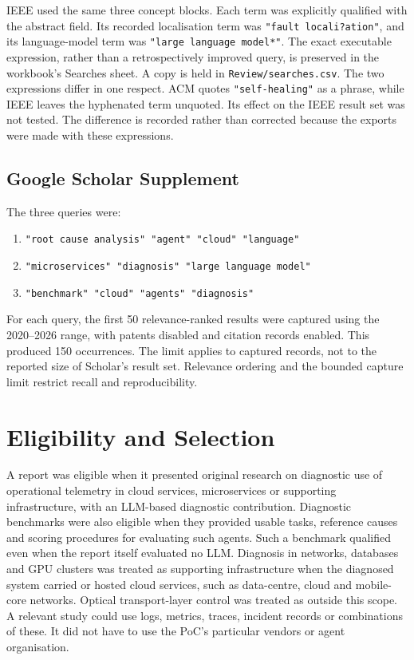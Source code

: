 IEEE used the same three concept blocks. Each term was explicitly
qualified with the abstract field. Its recorded localisation term was
\texttt{"fault locali?ation"}, and its language-model term was
\texttt{"large language model*"}. The exact executable expression, rather
than a retrospectively improved query, is preserved in the workbook's
Searches sheet. A copy is held in \texttt{Review/searches.csv}. The two
expressions differ in one respect. ACM quotes \texttt{"self-healing"} as a
phrase, while IEEE leaves the hyphenated term unquoted. Its effect on the
IEEE result set was not tested. The difference is recorded rather than
corrected because the exports were made with these expressions.

\subsection{Google Scholar Supplement}

The three queries were:
\begin{enumerate}
\item \texttt{"root cause analysis" "agent" "cloud" "language"}
\item \texttt{"microservices" "diagnosis" "large language model"}
\item \texttt{"benchmark" "cloud" "agents" "diagnosis"}
\end{enumerate}

For each query, the first 50 relevance-ranked results were captured using
the 2020--2026 range, with patents disabled and citation records enabled.
This produced 150 occurrences. The limit applies to captured records,
not to the reported size of Scholar's result set. Relevance ordering and
the bounded capture limit restrict recall and reproducibility.

\section{Eligibility and Selection}

A report was eligible when it presented original research on diagnostic
use of operational telemetry in cloud services, microservices or supporting
infrastructure, with an LLM-based diagnostic contribution. Diagnostic
benchmarks were also eligible when they provided usable tasks, reference
causes and scoring procedures for evaluating such agents. Such a benchmark
qualified even when the report itself evaluated no LLM. Diagnosis in
networks, databases and GPU clusters was treated as supporting
infrastructure when the diagnosed system carried or hosted cloud services,
such as data-centre, cloud and mobile-core networks. Optical
transport-layer control was treated as outside this scope. A relevant study
could use logs, metrics, traces, incident records or combinations of these.
It did not have to use the PoC's particular vendors or agent organisation.

